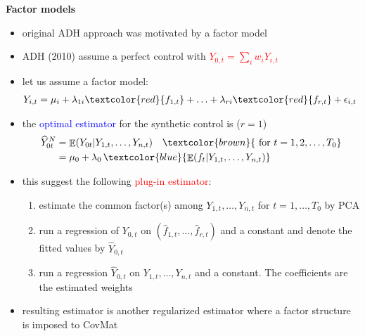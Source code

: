 \documentclass{beamer}
\def\E{\mathop{\mathbb{E}}\limits}
\newcommand{\blue}[1]{\textcolor{blue}{#1}}
\newcommand{\red}[1]{\textcolor{red}{#1}}
\begin{document}
\begin{frame}{\bf Factor models}

\begin{itemize}
\item original ADH approach was motivated by a factor model
\item ADH (2010) assume a perfect control with \red{$Y_{0,t}=\sum_i w_i Y_{i,t}$}
\item let us assume a factor model:
{\small \begin{align*}
Y_{i,t} &= \mu_i + \lambda_{1i} \red{f_{1,t}} + \ldots + \lambda_{ri} \red{f_{r,t}}  + \epsilon_{i,t}
\end{align*}}
\item the \blue{optimal estimator} for the synthetic control is ($r=1$)
{\small \begin{align*}
\widehat Y_{0t}^N &=  \E( Y_{0t}| Y_{1,t},\ldots,Y_{n,t} ) \quad \textcolor{brown}{ \text{ for } t=1,2,\ldots, T_0 } \\
&= \mu_0 + \lambda_0 \, \blue{ \E( f_{t}| Y_{1,t},\ldots,Y_{n,t} )}
\end{align*} }
\item this suggest the following \red{plug-in estimator}:
\begin{enumerate}
\item estimate the common factor(s) among $Y_{1,t},\ldots,Y_{n,t}$ for $t=1,\ldots,T_0$ by PCA
\item run a regression of $Y_{0,t}$ on $(\widehat f_{1,t},\ldots,\widehat f_{r,t})$ and a constant and denote the fitted values by $\widehat Y_{0,t}$
\item run a regression $\widehat Y_{0,t}$ on $Y_{1,t},\ldots,Y_{n,t}$ and a constant. The coefficients are the estimated weights
\end{enumerate}
\item resulting estimator is another regularized estimator where a factor structure is imposed to CovMat
\end{itemize}
\end{frame}
\end{document}
